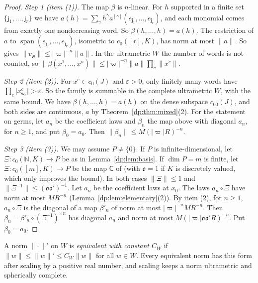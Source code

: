 \documentclass[11pt]{amsart}
\theoremstyle{definition}
\theoremstyle{remark}
\numberwithin{equation}{section}
\newcommand{\N}{\mathbb N}
\newcommand{\spn}{\operatorname{span}}
\newcommand{\abs}[1]{\lvert #1\rvert}
\newcommand{\norm}[1]{\lVert #1\rVert}
\theoremstyle{plain}
\theoremstyle{definition}
\theoremstyle{plain}
\begin{document}
\begin{proof}
\emph{Step 1 (item (1)).} The map $\beta$ is $n$\nobreakdash-linear. For $h$ supported in a finite set $\{\mathsf j_1,\dots,\mathsf j_r\}$ we have $a(h)=\sum_\gamma h^\gamma a^{[\gamma]}(e_{\mathsf j_1},\dots,e_{\mathsf j_r})$, and each monomial comes from exactly one nondecreasing word. So $\beta(h,\dots,h)=a(h)$. The restriction of $a$ to $\spn(e_{\mathsf j_1},\dots,e_{\mathsf j_r})$, isometric to $c_0([r],K)$, has norm at most $\norm a$. So \cite[Lemma~Q.2(4)]{I} gives $\norm{v_{\mathsf w}}\le\abs\varpi^{-n}\norm a$. In the ultrametric $W$ the number of words is not counted, so $\norm{\beta(x^1,\dots,x^n)}\le\abs\varpi^{-n}\norm a\prod_c\norm{x^c}$.

\emph{Step 2 (item (2)).} For $x^c\in c_0(J)$ and $\varepsilon>0$, only finitely many words have $\prod_c\abs{x^c_{\mathsf w_c}}>\varepsilon$. So the family is summable in the complete ultrametric $W$, with the same bound. We have $\beta(h,\dots,h)=a(h)$ on the dense subspace $c_{00}(J)$, and both sides are continuous, $a$ by Theorem~\ref{dp:thm:mixed}(2). For the statement on germs, let $a_n$ be the coefficient laws and $\beta_n$ the map above with diagonal $a_n$, for $n\ge1$, and put $\beta_0=a_0$. Then $\norm{\beta_n}\le M(\abs\varpi R)^{-n}$.

\emph{Step 3 (item (3)).} We may assume $P\ne\{0\}$. If $P$ is infinite-dimensional, let $\Xi\colon c_0(\N,K)\to P$ be as in Lemma~\ref{dp:lem:basis}. If $\dim P=m$ is finite, let $\Xi\colon c_0([m],K)\to P$ be the map $\mathsf C$ of \cite[Lemma~Q.13(3)]{I} (with $\mathfrak o=1$ if $K$ is discretely valued, which only improves the bound). In both cases $\norm\Xi\le1$ and $\norm{\Xi^{-1}}\le(\mathfrak o\mathfrak o')^{-1}$. Let $a_n$ be the coefficient laws at $x_0$. The laws $a_n\circ\Xi$ have norm at most $MR^{-n}$ (Lemma~\ref{dp:lem:elementary}(2)). By item (2), for $n\ge1$, $a_n\circ\Xi$ is the diagonal of a map $\beta'_n$ of norm at most $\abs\varpi^{-n}MR^{-n}$. Then $\beta_n=\beta'_n\circ(\Xi^{-1})^{\times n}$ has diagonal $a_n$ and norm at most $M(\abs\varpi\mathfrak o\mathfrak o'R)^{-n}$. Put $\beta_0=a_0$.
\end{proof}

A norm $\norm\cdot'$ on $W$ is \emph{equivalent with constant $C_W$} if $\norm w\le\norm w'\le C_W\norm w$ for all $w\in W$. Every equivalent norm has this form after scaling by a positive real number, and scaling keeps a norm ultrametric and spherically complete.
\end{document}
